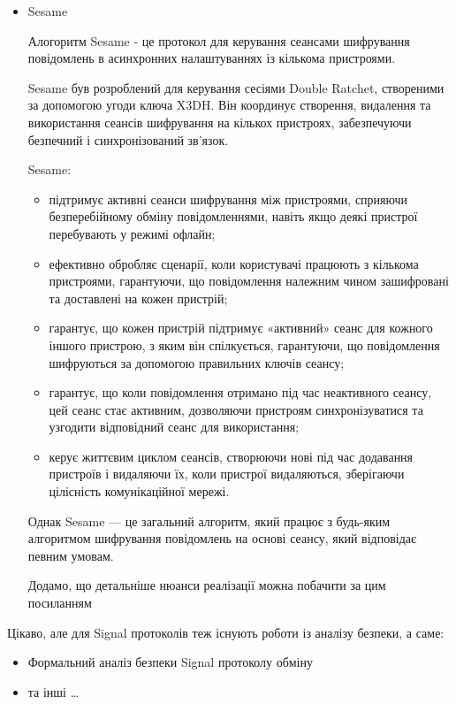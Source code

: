 \begin{itemize}
    \item Sesame 

        Алогоритм Sesame - це протокол для керування сеансами шифрування повідомлень в асинхронних налаштуваннях із кількома пристроями.

        Sesame був розроблений для керування сесіями Double Ratchet, створеними за допомогою угоди ключа X3DH. Він координує створення, видалення та використання сеансів шифрування на кількох пристроях, забезпечуючи безпечний і синхронізований зв’язок.


        Sesame:
        \begin{itemize}
            \item підтримує активні сеанси шифрування між пристроями, сприяючи безперебійному обміну повідомленнями, навіть якщо деякі пристрої перебувають у режимі офлайн;
            \item ефективно обробляє сценарії, коли користувачі працюють з кількома пристроями, гарантуючи, що повідомлення належним чином зашифровані та доставлені на кожен пристрій;
            \item гарантує, що кожен пристрій підтримує «активний» сеанс для кожного іншого пристрою, з яким він спілкується, гарантуючи, що повідомлення шифруються за допомогою правильних ключів сеансу;
            \item гарантує, що коли повідомлення отримано під час неактивного сеансу, цей сеанс стає активним, дозволяючи пристроям синхронізуватися та узгодити відповідний сеанс для використання;
            \item керує життєвим циклом сеансів, створюючи нові під час додавання пристроїв і видаляючи їх, коли пристрої видаляються, зберігаючи цілісність комунікаційної мережі.
        \end{itemize}
        
        
        Однак Sesame — це загальний алгоритм, який працює з будь-яким алгоритмом шифрування повідомлень на основі сеансу, який відповідає певним умовам.
        
        Додамо, що детальніше нюанси реалізації можна побачити за цим посиланням \cite{marlinspike2017sesame}
\end{itemize}

Цікаво, але для Signal протоколів теж існують роботи із аналізу безпеки, а саме:
\begin{itemize}
    \item Формальний аналіз безпеки Signal протоколу обміну\cite{cohn-gordon2016formal}
    \item та інші \dots
\end{itemize}


